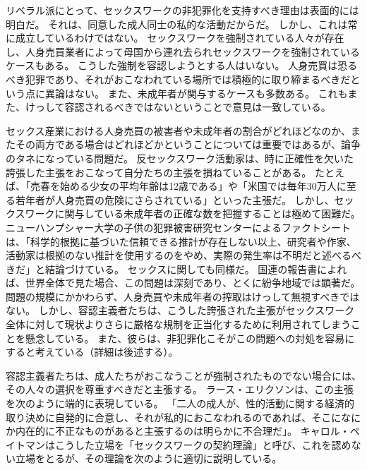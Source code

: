 \documentclass[paper=a4,book,openany]{jlreq}
\begin{document}
リベラル派にとって、セックスワークの非犯罪化を支持すべき理由は表面的には明白だ。
それは、同意した成人同士の私的な活動だからだ。
しかし、これは常に成立しているわけではない。
セックスワークを強制されている人々が存在し、人身売買業者によって母国から連れ去られセックスワークを強制されているケースもある。
こうした強制を容認しようとする人はいない。
人身売買は恐るべき犯罪であり、それがおこなわれている場所では積極的に取り締まるべきだという点に異論はない。
また、未成年者が関与するケースも多数ある。
これもまた、けっして容認されるべきではないということで意見は一致している。

セックス産業における人身売買の被害者や未成年者の割合がどれほどなのか、またその両方である場合はどれほどかということについては重要ではあるが、論争のタネになっている問題だ。
反セックスワーク活動家は、時に正確性を欠いた誇張した主張をおこなって自分たちの主張を損ねていることがある。
たとえば、「売春を始める少女の平均年齢は12歳である」や「米国では毎年30万人に至る若年者が人身売買の危険にさらされている」といった主張だ\citep{hall14:_is_one_most_cited_statis}。
しかし、セックスワークに関与している未成年者の正確な数を把握することは極めて困難だ。
ニューハンプシャー大学の子供の犯罪被害研究センターによるファクトシートは、「科学的根拠に基づいた信頼できる推計が存在しない以上、研究者や作家、活動家は根拠のない推計を使用するのをやめ、実際の発生率は不明だと述べるべきだ」と結論づけている\citep{children08:_sex_traff_minor}。
セックスに関しても同様だ。
国連の報告書によれば、世界全体で見た場合、この問題は深刻であり、とくに紛争地域では顕著だ\citep{drugs18:_global_repor_traff_person}。
問題の規模にかかわらず、人身売買や未成年者の搾取はけっして無視すべきではない。
しかし、容認主義者たちは、こうした誇張された主張がセックスワーク全体に対して現状よりさらに厳格な規制を正当化するために利用されてしまうことを懸念している。
また、彼らは、非犯罪化こそがこの問題への対処を容易にすると考えている（詳細は後述する）。

容認主義者たちは、成人たちがおこなうことが強制されたものでない場合には、その人々の選択を尊重すべきだと主張する。
ラース・エリクソンは、この主張を次のように端的に表現している。
「二人の成人が、性的活動に関する経済的取り決めに自発的に合意し、それが私的におこなわれるのであれば、そこになにか内在的に不正なものがあると主張するのは明らかに不合理だ」\citep[pp.338--339]{ericsson80:_charg_again_prost}。
キャロル・ペイトマンはこうした立場を「セックスワークの契約理論」と呼び、これを認めない立場をとるが、その理論を次のように適切に説明している。
\end{document}
